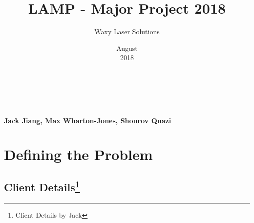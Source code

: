 \documentclass[oneside,openany,11pt,a4paper]{report}
\title{LAMP - Major Project 2018}
\date{August\\ 2018}
\author{Waxy Laser Solutions}
\begin{document}
	\begin{titlepage}
	\makeatletter
		\centering
		\vfill
		\vfill
		\vfill
		\vfill
		\vfill
		{\bfseries\Huge
				\@title \\
		}
			
			\vfill{
			\bfseries\huge \@author \\ \normalfont\huge Jack Jiang,  Max Wharton-Jones,  Shourov Quazi
		}
	\vfill{
			\huge{\@date}}

	
		
		\vfill
		\vfill
		\vfill
		
			\makeatother
	\end{titlepage}

	
	\newpage
	\tableofcontents
	
	

	

\chapter{Defining the Problem}
\section[Client Details]{Client Details\protect\footnote{Client Details by Jack}}
\end{document}
